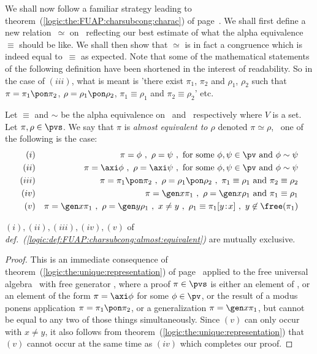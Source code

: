 We shall now follow a familiar strategy leading to
theorem~(\ref{logic:the:FUAP:charsubcong:charac}) of
page~\pageref{logic:the:FUAP:charsubcong:charac}. We shall first
define a new relation~$\simeq$ on \pvs\ reflecting our best estimate
of what the alpha equivalence~$\equiv$ should be like. We
shall then show that $\simeq$ is in fact a congruence which is
indeed equal to~$\equiv$ as expected. Note that some of the
mathematical statements of the following definition have been
shortened in the interest of readability. So in the case of $(iii)$,
what is meant is 'there exist $\pi_{1}$, $\pi_{2}$ and $\rho_{1}$,
$\rho_{2}$ such that $\pi=\pi_{1}\pon\pi_{2}$,
$\rho=\rho_{1}\pon\rho_{2}$, $\pi_{1}\equiv\rho_{1}$ and
$\pi_{2}\equiv\rho_{2}$' etc.


\begin{defin}\label{logic:def:FUAP:charsubcong:almost:equivalent}
Let $\equiv$ and $\sim$ be the alpha equivalence on \pvs\ and
\pv\ respectively where $V$ is a set. Let $\pi,\rho\in\pvs$. We say
that $\pi$ is {\em almost equivalent to $\rho$} denoted
$\pi\simeq\rho$, \ifand\ one of the following is the case:
    \begin{eqnarray*}
    (i)&&\pi=\phi\ ,\ \rho=\psi\ ,\ \mbox{for some}\ \phi,\psi\in\pv\ \mbox{and}\ \phi\sim\psi\\
    (ii)&&\pi=\axi\phi\ ,\ \rho=\axi\psi\ ,\ \mbox{for some}\ \phi,\psi\in\pv\ \mbox{and}\ \phi\sim\psi\\
    (iii)&&\pi=\pi_{1}\pon\pi_{2}\ ,\ \rho=\rho_{1}\pon\rho_{2}\ ,\
    \pi_{1}\equiv\rho_{1}\ \mbox{and}\ \pi_{2}\equiv\rho_{2}\\
    (iv)&&\pi=\gen x\pi_{1}\ ,\ \rho=\gen x\rho_{1}\ \mbox{and}\ \pi_{1}\equiv\rho_{1}\\
    (v)&&\pi=\gen x\pi_{1}\ ,\ \rho=\gen y\rho_{1}\ ,\ x\neq y\ ,\
    \rho_{1}\equiv \pi_{1}[y\!:\!x]\ ,\ y\not\in\free(\pi_{1})
    \end{eqnarray*}
\end{defin}

\begin{prop}
$(i),(ii),(iii),(iv), (v)$ of {\em
def.~(\ref{logic:def:FUAP:charsubcong:almost:equivalent})} are
mutually exclusive.
\end{prop}
\begin{proof}
This is an immediate consequence of
theorem~(\ref{logic:the:unique:representation}) of
page~\pageref{logic:the:unique:representation} applied to the free
universal algebra \pvs\ with free generator \pv, where a proof
$\pi\in\pvs$ is either an element of \pv, or an element of the form
$\pi=\axi\phi$ for some $\phi\in\pv$, or the result of a modus
ponens application $\pi=\pi_{1}\pon\pi_{2}$, or a generalization
$\pi=\gen x\pi_{1}$, but cannot be equal to any two of those things
simultaneously. Since $(v)$ can only occur with $x\neq y$, it also
follows from theorem~(\ref{logic:the:unique:representation}) that
$(v)$ cannot occur at the same time as $(iv)$ which completes our
proof.
\end{proof}

